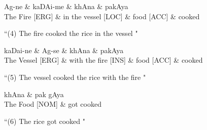 \documentclass[twoside]{article}
\begin{document}
\hypertarget{fig4}{}
\begin{center}
\begin{dependency}[arc edge, arc angle=80, text only label, label style={above}]
   \begin{deptext}[column sep=1em]
      Ag-ne \&  kaDAi-me \& khAna \& pakAya \\
      The Fire [ERG] \& in the vessel [LOC] \& food [ACC]  \& cooked \\
   \end{deptext}
\end{dependency} 

 ``(4) The fire cooked the rice in the vessel " 
 

\end{center}

\hypertarget{fig5}{}
\begin{center}
\begin{dependency}[arc edge, arc angle=80, text only label, label style={above}]
   \begin{deptext}[column sep=1em]
      kaDai-ne \&  Ag-se \& khAna \& pakAya \\
      The Vessel [ERG] \& with the fire [INS] \& food [ACC]  \& cooked \\
   \end{deptext}
\end{dependency} 

 ``(5) The vessel cooked the rice with the fire " 
 

\end{center}

\hypertarget{fig6}{}
\begin{center}
\begin{dependency}[arc edge, arc angle=80, text only label, label style={above}]
   \begin{deptext}[column sep=1em]
      khAna \& pak gAya \\
      The Food [NOM] \& got cooked \\
   \end{deptext}
   
\end{dependency} 

 ``(6) The rice got cooked " 
 

\end{center}
\end{document}
